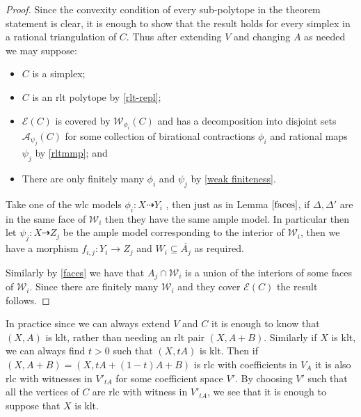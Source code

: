 	\begin{proof}
		
		Since the convexity condition of every sub-polytope in the theorem statement is clear, it is enough to show that the result holds for every simplex in a rational triangulation of $C$. Thus after extending $V$ and changing $A$ as needed we may suppose:
		
		\begin{itemize}
			\item $C$ is a simplex;
			\item $C$ is an rlt polytope by \autoref{rlt-repl};
			\item $\mathcal{E}(C)$ is covered by $\mathcal{W}_{\phi_{i}}(C)$  and has a decomposition into disjoint sets $\mathcal{A}_{\psi_{j}}(C)$
			for some collection of birational contractions $\phi_{i}$ and rational maps $\psi_{j}$ by \autoref{rltmmp}; and
			\item There are only finitely many $\phi_{i}$ and $\psi_{j}$ by \autoref{weak finiteness}.
		\end{itemize}
			
		Take one of the wlc models $\phi_{i}:X \dashrightarrow Y_{i}$ , then just as in Lemma $\ref{faces}$, if $\Delta,\Delta'$ are in the same face of $\mathcal{W}_{i}$ then they have the same ample model. In particular then let $\psi_{j}:X \dashrightarrow Z_{j}$ be the ample model corresponding to the interior of $\mathcal{W}_{i}$, then we have a morphism $f_{i,j}: Y_{i} \to Z_{j}$ and  $W_{i} \subseteq \overline{A_{j}}$ as required. 
		
		Similarly by \autoref{faces} we have that $A_{j} \cap \mathcal{W}_{i}$ is a union of the interiors of some faces of $\mathcal{W}_{i}$. Since there are finitely many $\mathcal{W}_{i}$ and they cover $\mathcal{E}(C)$ the result follows.
	\end{proof}

	\begin{remark}
	In practice since we can always extend $V$ and $C$ it is enough to know that $(X,A)$ is klt, rather than needing an rlt pair $(X,A+B)$. Similarly if $X$ is klt, we can always find $t>0$ such that $(X,tA)$ is klt. Then if $(X,A+B)=(X,tA+(1-t)A+B)$ is rlc with coefficients in $V_{A}$ it is also rlc with witnesses in $V'_{tA}$ for some coefficient space $V'$. By choosing $V'$ such that all the vertices of $C$ are rlc with witness in $V'_{tA}$, we see that it is enough to suppose that $X$ is klt.
	\end{remark}

